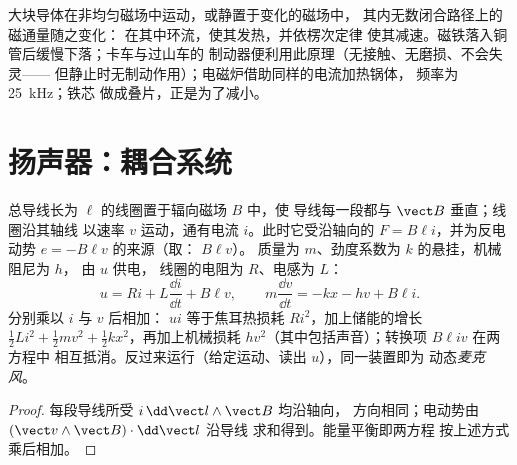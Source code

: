 \begin{example}[涡流]\label{ex:b1:induction:eddy}
大块导体在非均匀磁场中运动，或静置于变化的磁场中，
其内无数闭合路径上的磁通量随之变化：
\emph{}在其中环流，使其发热，并依楞次定律
使其减速。磁铁落入铜管后缓慢下落；卡车与过山车的
制动器便利用此原理（无接触、无磨损、不会失灵——
但静止时无制动作用）；电磁炉借助同样的电流加热锅体，
频率为 \qty{25}{kHz}；铁芯
做成叠片，正是为了减小。
\end{example}

\section{扬声器：耦合系统}

\begin{proposition}[线圈在辐向磁场中的机电耦合]\label{prop:b1:induction:loudspeaker}
总导线长为 $\ell$ 的线圈置于辐向磁场 $B$ 中，使
导线每一段都与 $\vect B$ 垂直；线圈沿其轴线
以速率 $v$ 运动，通有电流 $i$。此时它受沿轴向的
$F = B\ell i$，并为反电动势 $e = -B\ell v$ 的来源（取： $B\ell v$）。
质量为 $m$、劲度系数为 $k$ 的悬挂，机械阻尼为 $h$，
由 $u$ 供电，
线圈的电阻为 $R$、电感为 $L$：
\[
u = Ri + L\frac{\dd i}{\dd t} + B\ell v , \qquad
m\frac{\dd v}{\dd t} = -kx - hv + B\ell i .
\]
分别乘以 $i$ 与 $v$ 后相加： $ui$
等于焦耳热损耗 $Ri^2$，加上储能的增长
$\tfrac12Li^2 + \tfrac12mv^2 + \tfrac12kx^2$，再加上机械损耗
$hv^2$（其中包括声音）；转换项 $B\ell iv$ 在两方程中
相互抵消。反过来运行（给定运动、读出 $u$），同一装置即为
动态\emph{麦克风}。
\end{proposition}

\begin{proof}
每段导线所受 $i\,\dd\vect l\wedge\vect B$ 均沿轴向，
方向相同；电动势由 $(\vect v\wedge\vect B)\cdot\dd\vect l$ 沿导线
求和得到。能量平衡即两方程
按上述方式乘后相加。
\end{proof}

